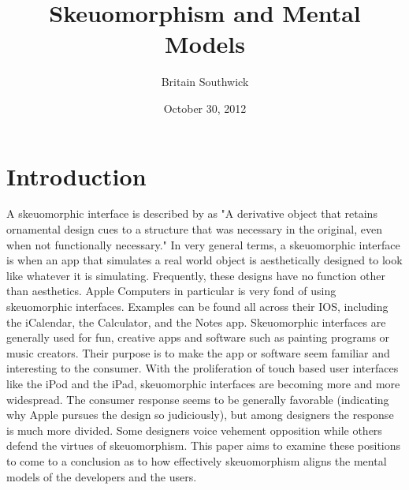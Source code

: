 \documentclass{article}
\title{Skeuomorphism and Mental Models}
\author{Britain Southwick}
\date{October 30, 2012}
\begin{document}
\maketitle


\pagebreak
\tableofcontents

\pagebreak
\listoffigures

\pagebreak
\listoftables

\pagebreak

%
%
\section{Introduction}
\label{introduction}

A skeuomorphic interface is described by\cite{medialoot} as "A derivative object that retains ornamental design cues to a structure that was necessary in the original, even when not functionally necessary." In very general terms, a skeuomorphic interface is when an app that simulates a real world object is aesthetically designed to look like whatever it is simulating. Frequently, these designs have no function other than aesthetics. Apple Computers in particular is very fond of using skeuomorphic interfaces. Examples can be found all across their IOS, including the iCalendar, the Calculator, and the Notes app. Skeuomorphic interfaces are generally used for fun, creative apps and software such as painting programs or music creators. Their purpose is to make the app or software seem familiar and interesting to the consumer. With the proliferation of touch based user interfaces like the iPod and the iPad, skeuomorphic interfaces are becoming more and more widespread. The consumer response seems to be generally favorable (indicating why Apple pursues the design so judiciously), but among designers the response is much more divided. Some designers voice vehement opposition while others defend the virtues of skeuomorphism. This paper aims to examine these positions to come to a conclusion as to how effectively skeuomorphism aligns the mental models of the developers and the users.
\end{document}
